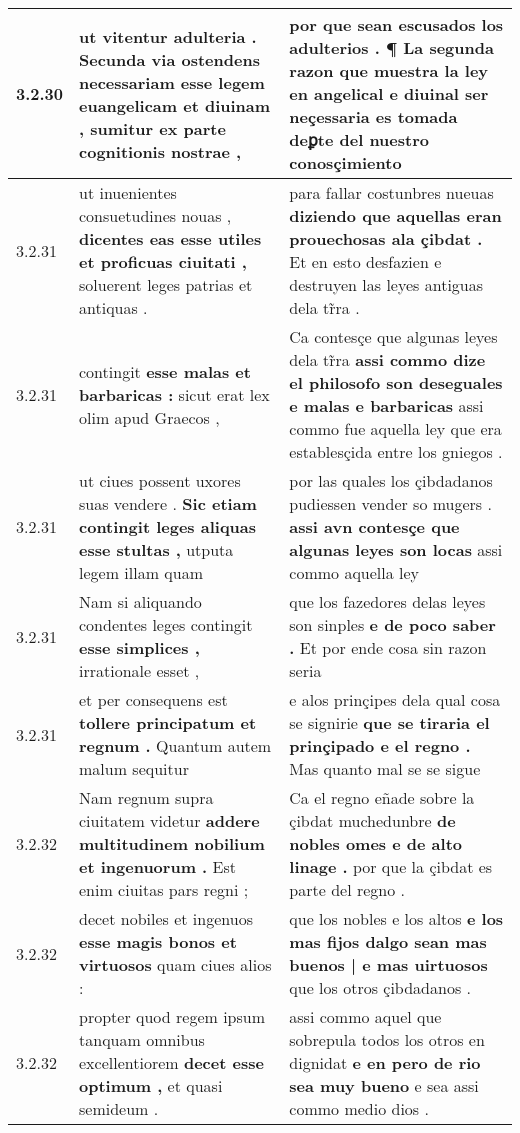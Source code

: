 \begin{tabular}{|p{1cm}|p{6.5cm}|p{6.5cm}|}
3.2.30 & ut vitentur adulteria . \textbf{ Secunda via ostendens necessariam esse legem euangelicam et diuinam , } sumitur ex parte cognitionis nostrae , & por que sean escusados los adulterios . \textbf{ ¶ La segunda razon que muestra la ley en angelical } e diuinal ser neçessaria es tomada deꝑte del nuestro conosçimiento \\\hline
3.2.31 & ut inuenientes consuetudines nouas , \textbf{ dicentes eas esse utiles et proficuas ciuitati , } soluerent leges patrias et antiquas . & para fallar costunbres nueuas \textbf{ diziendo que aquellas eran prouechosas ala çibdat . } Et en esto desfazien e destruyen las leyes antiguas dela tr̃ra . \\\hline
3.2.31 & contingit \textbf{ esse malas et barbaricas : } sicut erat lex olim apud Graecos , & Ca contesçe que algunas leyes dela tr̃ra \textbf{ assi commo dize el philosofo son deseguales e malas e barbaricas } assi commo fue aquella ley que era establesçida entre los gniegos . \\\hline
3.2.31 & ut ciues possent uxores suas vendere . \textbf{ Sic etiam contingit leges aliquas esse stultas , } utputa legem illam quam & por las quales los çibdadanos pudiessen vender so mugers . \textbf{ assi avn contesçe que algunas leyes son locas } assi commo aquella ley \\\hline
3.2.31 & Nam si aliquando condentes leges contingit \textbf{ esse simplices , } irrationale esset , & que los fazedores delas leyes son sinples \textbf{ e de poco saber . } Et por ende cosa sin razon seria \\\hline
3.2.31 & et per consequens est \textbf{ tollere principatum et regnum . } Quantum autem malum sequitur & e alos prinçipes dela qual cosa se signirie \textbf{ que se tiraria el prinçipado e el regno . } Mas quanto mal se se sigue \\\hline
3.2.32 & Nam regnum supra ciuitatem videtur \textbf{ addere multitudinem nobilium et ingenuorum . } Est enim ciuitas pars regni ; & Ca el regno eñade sobre la çibdat muchedunbre \textbf{ de nobles omes e de alto linage . } por que la çibdat es parte del regno . \\\hline
3.2.32 & decet nobiles et ingenuos \textbf{ esse magis bonos et virtuosos } quam ciues alios : & que los nobles e los altos \textbf{ e los mas fijos dalgo sean mas buenos | e mas uirtuosos } que los otros çibdadanos . \\\hline
3.2.32 & propter quod regem ipsum tanquam omnibus excellentiorem \textbf{ decet esse optimum , } et quasi semideum . & assi commo aquel que sobrepula todos los otros en dignidat \textbf{ e en pero de rio sea muy bueno } e sea assi commo medio dios . \\\hline

\end{tabular}
